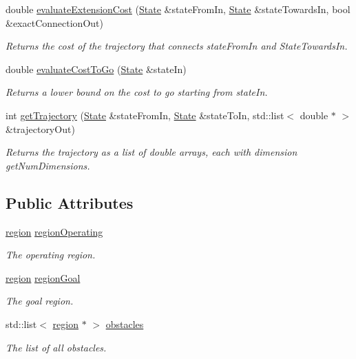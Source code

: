 \begin{DoxyCompactItemize}
double \hyperlink{class_single_integrator_1_1_system_a54c10d1e2bd5da67907f462a4ee80520}{evaluate\-Extension\-Cost} (\hyperlink{class_single_integrator_1_1_state}{State} \&state\-From\-In, \hyperlink{class_single_integrator_1_1_state}{State} \&state\-Towards\-In, bool \&exact\-Connection\-Out)
\begin{DoxyCompactList}\small\item\em Returns the cost of the trajectory that connects state\-From\-In and State\-Towards\-In. \end{DoxyCompactList}\item 
double \hyperlink{class_single_integrator_1_1_system_a59f6ec06d751bd3379b093a1abc7d0e1}{evaluate\-Cost\-To\-Go} (\hyperlink{class_single_integrator_1_1_state}{State} \&state\-In)
\begin{DoxyCompactList}\small\item\em Returns a lower bound on the cost to go starting from state\-In. \end{DoxyCompactList}\item 
int \hyperlink{class_single_integrator_1_1_system_a1f930969859d30680f0032cce569671c}{get\-Trajectory} (\hyperlink{class_single_integrator_1_1_state}{State} \&state\-From\-In, \hyperlink{class_single_integrator_1_1_state}{State} \&state\-To\-In, std\-::list$<$ double $\ast$ $>$ \&trajectory\-Out)
\begin{DoxyCompactList}\small\item\em Returns the trajectory as a list of double arrays, each with dimension get\-Num\-Dimensions. \end{DoxyCompactList}\end{DoxyCompactItemize}
\subsection*{Public Attributes}
\begin{DoxyCompactItemize}
\item 
\hyperlink{class_single_integrator_1_1region}{region} \hyperlink{class_single_integrator_1_1_system_a5e8c414d1dee683eb89a241feae1adda}{region\-Operating}
\begin{DoxyCompactList}\small\item\em The operating region. \end{DoxyCompactList}\item 
\hyperlink{class_single_integrator_1_1region}{region} \hyperlink{class_single_integrator_1_1_system_a8d2b26130eb5f1eeedd1e5e9ca60fcb5}{region\-Goal}
\begin{DoxyCompactList}\small\item\em The goal region. \end{DoxyCompactList}\item 
std\-::list$<$ \hyperlink{class_single_integrator_1_1region}{region} $\ast$ $>$ \hyperlink{class_single_integrator_1_1_system_a96c9a62c201376a973ef1e6df66e9f2a}{obstacles}
\begin{DoxyCompactList}\small\item\em The list of all obstacles. \end{DoxyCompactList}\end{DoxyCompactItemize}


